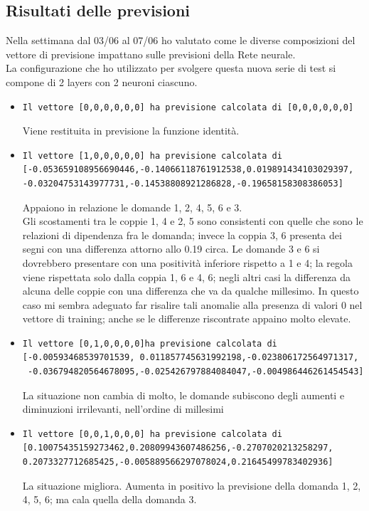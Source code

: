 \subsection{Risultati delle previsioni}
\label{Risultati delle previsioni}
Nella settimana dal 03/06 al 07/06 ho valutato come le diverse composizioni del vettore di previsione impattano sulle previsioni della Rete neurale.\\
La configurazione che ho utilizzato per svolgere questa nuova serie di test si compone di 2 layers con 2 neuroni ciascuno.
\begin{itemize}
\item \begin{verbatim}Il vettore [0,0,0,0,0,0] ha previsione calcolata di [0,0,0,0,0,0]
\end{verbatim}
Viene restituita in previsione la funzione identit\`a.

\item \begin{verbatim}Il vettore [1,0,0,0,0,0] ha previsione calcolata di
[-0.053659108956690446,-0.14066118761912538,0.019891434103029397,
-0.03204753143977731,-0.14538808921286828,-0.19658158308386053]
\end{verbatim}
Appaiono in relazione le domande 1, 2, 4, 5, 6 e 3.\\
Gli scostamenti tra le coppie 1, 4 e 2, 5 sono consistenti con quelle che sono le relazioni di dipendenza fra le domanda; invece la coppia 3, 6 presenta dei segni con una differenza attorno allo 0.19 circa.
Le domande 3 e 6 si dovrebbero presentare con una positivit\`a inferiore rispetto a 1 e 4; la regola viene rispettata solo dalla coppia 1, 6 e 4, 6; negli altri casi la differenza da alcuna delle coppie con una differenza che va da qualche millesimo. In questo caso  mi sembra adeguato far risalire tali anomalie alla presenza di valori 0 nel vettore di training; anche se le differenze riscontrate appaino molto elevate.


\item \begin{verbatim}Il vettore [0,1,0,0,0,0]ha previsione calcolata di
[-0.00593468539701539, 0.011857745631992198,-0.023806172564971317,
 -0.036794820564678095,-0.025426797884084047,-0.004986446261454543]
\end{verbatim}
La situazione non cambia di molto, le domande subiscono degli aumenti e diminuzioni irrilevanti, nell'ordine di millesimi

\item \begin{verbatim}Il vettore [0,0,1,0,0,0] ha previsione calcolata di
[0.10075435159273462,0.20809943607486256,-0.2707020213258297,
0.2073327712685425,-0.005889566297078024,0.21645499783402936]
\end{verbatim}
La situazione migliora. Aumenta in positivo la previsione della domanda 1, 2, 4, 5, 6; ma cala quella della domanda 3.



\end{itemize}
